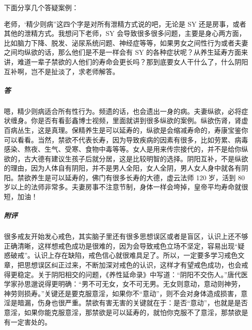 下面分享几个答疑案例：

\begin{case}
    老师，‘精少则病”这四个字是对所有泄精方式说的吧，无论是 SY 还是房事，或者其他的泄精方式。我想问下老师，SY 会导致很多很多问题，主要是身心两方面，比如脑力下降、脱发、泌尿系统问题、神经症等等，如果男女之间性行为或者夫妻之间均纵欲的话，那么他们是不是一样会有 SY 的各种症状呢？从养生延寿方面来讲，难道一辈子禁欲的人他们的寿命会更长吗？那到底要女人干什么了，什么阴阳互补啊，岂不是扯淡了，求老师解答。
    \subparagraph{答} 嗯，精少则病适合所有性行为。频遗的话，也会遗出一身的病。夫妻纵欲，必将症状缠身。你是否有看彭鑫博士视频，里面就讲到很多纵欲的案例。纵欲伤肾，肾虚百病丛生，这是真理。保精养生是可以延寿的，纵欲是会缩减寿命的，寿康宝鉴你可以看看。当然，禁欲不代表长寿，因为导致疾病的因素有很多，比如劳累、病毒感染、熬夜、生气、受寒、食物中毒等等。女人是用来传宗接代的，并不是给你纵欲的，古大德有建议生孩子后就分居，这是比较明智的选择。阴阳互补，不是纵欲的理由，因为人体自有阴阳，并不是男人全阳，女人全阴，男人女人身中就各有阴阳。禁欲养生是可以延寿的，佛门有很多长寿的大德，虚云法师 120 岁，活到 80 岁以上的法师非常多。夫妻房事不注意节制，身体一样会垮掉，皇帝平均寿命就很短，加油！
    \subparagraph{附评} 很多戒友开始发心戒色，其实脑子里还有很多思想误区或者是盲区，认识上还不够正确清晰，这样想戒色成功是很难的，因为会导致戒色立场不坚定，容易出现“疑惑破戒”。认识上存在缺陷，戒色信心就很难具足了。所以，一定要多学习戒色文章，把思想误区纠正过来，不断加深对戒色的认识，这样才有望戒色成功，也会戒得更稳定。关于阴阳相交的问题，《养性延命录》中写道：“阴阳不交伤人。”唐代医学家孙思邈说得更明确：“男不可无女，女不可无男。无女则意动，意动则神劳，神劳则损寿。”关键还是要克服意淫，如果你不“意动”，则不会对身体造成损害，意淫是暗漏，伤身也很严重。禁欲有害无害的关键就在于：是否“意动”，也就是是否意淫，如果你能克服意淫，那禁欲是可以延寿的，就怕你克服不了意淫，那禁欲是有一定害处的。
\end{case}

